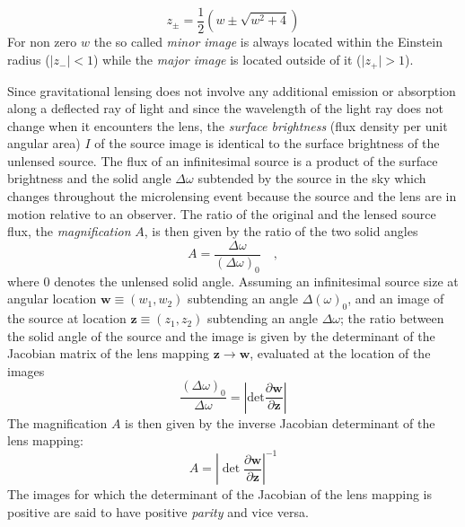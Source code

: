 \documentclass[12pt,dvipsnames]{report}
\begin{document}
\begin{equation}
    z_\pm= \frac{1}{2} \left( w\pm\sqrt{w^2 +4}\right)
    \label{eq:images_location}
\end{equation}
For non zero $w$ the so called \emph{minor image} is always located
within the Einstein radius ($\lvert z_-\rvert<1$) while the \emph{major image}
is located outside of it ($\lvert z_+\rvert>1$).

Since gravitational lensing does not involve any additional emission or
absorption along a deflected ray of light and since the wavelength of the light
ray does not change when it encounters the lens, the \emph{surface brightness}
(flux density per unit angular area) $I$ of the source image is identical to
the surface brightness of the unlensed source. The flux of an infinitesimal
source is a product of the surface brightness and the solid angle $\Delta
    \omega$ subtended by the source in the sky which changes throughout the
microlensing event because the source and the lens are in motion relative to an
observer. The ratio of the original and the lensed source flux, the
\emph{magnification} $A$, is then given by the ratio of the two solid angles
\begin{equation}
    A= \frac{\Delta \omega}{(\Delta\omega)_0}\quad,
    \label{eq:magnification}
\end{equation}
where $0$ denotes the unlensed solid angle.
Assuming an infinitesimal source size at angular location
$\mathbf w \equiv (w_1,w_2)$ subtending an angle
$\Delta (\omega)_0$, and an image of the source at location
$\mathbf z\equiv(z_1,z_2)$ subtending an angle
$\Delta \omega$; the ratio between the solid angle of the source and the image
is given by the determinant of the Jacobian matrix of the
lens mapping $\mathbf{z}\rightarrow\mathbf{w}$, evaluated at the location of
the images
\begin{equation}
    \frac{(\Delta\omega)_0}{\Delta\omega} =\left\lvert\textrm{det}
    \frac{\partial \mathbf w}{\partial \mathbf z} \right\rvert
\end{equation}
The magnification $A$ is then given by the inverse Jacobian determinant
of the lens mapping:
\begin{equation}
    A= \left\lvert\det
    \frac{\partial \mathbf w}{\partial \mathbf z} \right\rvert^{-1} \label{eq:magnification_general}
\end{equation}
The images for which the determinant of the Jacobian of the lens mapping is
positive are said to have positive \emph{parity} and vice versa.
\end{document}
